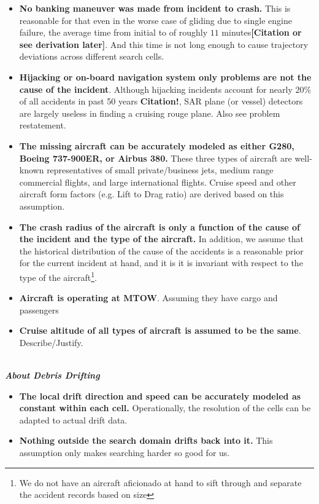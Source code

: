 \documentclass[12pt, letterpaper]{article}  %
\theoremstyle{definition}
\theoremstyle{remark}
\theoremstyle{plain}
\begin{document}
\begin{itemize}
\item \textbf{No banking maneuver was made from incident to crash.} This is reasonable for that even in the worse case of gliding due to single engine failure, the average time from initial to of roughly $11$ minutes\textbf{[Citation or see derivation later]}. And this time is not long enough to cause trajectory deviations across different search cells.
\item \textbf{Hijacking or on-board navigation system only problems are not the cause of the incident}. Although hijacking incidents account for nearly $20$\% of all accidents in past 50 years \textbf{Citation!}, SAR plane (or vessel) detectors are largely useless in finding a cruising rouge plane. Also see problem restatement.
\item \textbf{The missing aircraft can be accurately modeled as either G280, Boeing 737-900ER, or Airbus 380.} These three types of aircraft are well-known representatives of small private/business jets, medium range commercial flights, and large international flights. Cruise speed and other aircraft form factors (e.g. Lift to Drag ratio) are derived based on this assumption.
\item \textbf{The crash radius of the aircraft is only a function of the cause of the incident and the type of the aircraft.} In addition, we assume that the historical distribution of the cause of the accidents is a reasonable prior for the current incident at hand, and it is it is invariant with respect to the type of the aircraft\footnote{We do not have an aircraft aficionado at hand to sift through and separate the accident records based on size}.
\item \textbf{Aircraft is operating at MTOW}. Assuming they have cargo and passengers 
\item \textbf{Cruise altitude of all types of aircraft is assumed to be the same}.  Describe/Justify.
\end{itemize}

\ \\
\textit{\textbf{About Debris Drifting}}
\begin{itemize}
\item \textbf{The local drift direction and speed can be accurately modeled as constant within each cell.} Operationally, the resolution of the cells can be adapted to actual drift data.
\item \textbf{Nothing outside the search domain drifts back into it.} This assumption only makes searching harder so good for us.
\end{itemize}
\end{document}
